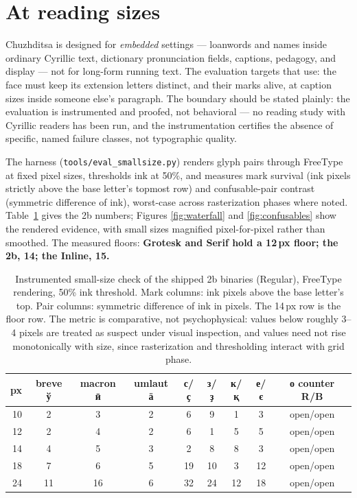 \documentclass[12pt]{article}
\newcommand{\cz}[1]{{\chu #1}}
\begin{document}
\section{At reading sizes}

Chuzhditsa is designed for \emph{embedded} settings — loanwords and names inside ordinary Cyrillic text, dictionary pronunciation fields, captions, pedagogy, and display — not for long-form running text. The evaluation targets that use: the face must keep its extension letters distinct, and their marks alive, at caption sizes inside someone else's paragraph. The boundary should be stated plainly: the evaluation is instrumented and proofed, not behavioral — no reading study with Cyrillic readers has been run, and the instrumentation certifies the absence of specific, named failure classes, not typographic quality.

The harness (\texttt{tools/eval\_smallsize.py}) renders glyph pairs through FreeType at fixed pixel sizes, thresholds ink at 50\%, and measures mark survival (ink pixels strictly above the base letter's topmost row) and confusable-pair contrast (symmetric difference of ink), worst-case across rasterization phases where noted. Table~\ref{tab:sizes} gives the 2b numbers; Figures \ref{fig:waterfall} and \ref{fig:confusables} show the rendered evidence, with small sizes magnified pixel-for-pixel rather than smoothed. The measured floors: \textbf{Grotesk and Serif hold a 12\,px floor; the 2b, 14; the Inline, 15.}

\begin{table}[ht]\centering\small
\begin{tabular}{rcccccccc}
\toprule
px & breve \cz{ў} & macron \cz{ӣ} & umlaut \cz{ӓ} & \cz{с}/\cz{ҫ} & \cz{з}/\cz{ҙ} & \cz{к}/\cz{қ} & \cz{е}/\cz{є} & \cz{о} counter R/B \\
\midrule
10 & 2 & 3 & 2 & 6 & 9 & 1 & 3 & open/open \\
12 & 2 & 4 & 2 & 6 & 1 & 5 & 5 & open/open \\
14 & 4 & 5 & 3 & 2 & 8 & 8 & 3 & open/open \\
18 & 7 & 6 & 5 & 19 & 10 & 3 & 12 & open/open \\
24 & 11 & 16 & 6 & 32 & 24 & 12 & 18 & open/open \\
\bottomrule
\end{tabular}
\caption{Instrumented small-size check of the shipped 2b binaries (Regular), FreeType rendering, 50\% ink threshold. Mark columns: ink pixels above the base letter's top. Pair columns: symmetric difference of ink in pixels. The 14\,px row is the floor row. The metric is comparative, not psychophysical: values below roughly 3--4 pixels are treated as suspect under visual inspection, and values need not rise monotonically with size, since rasterization and thresholding interact with grid phase.}
\label{tab:sizes}
\end{table}
\end{document}
